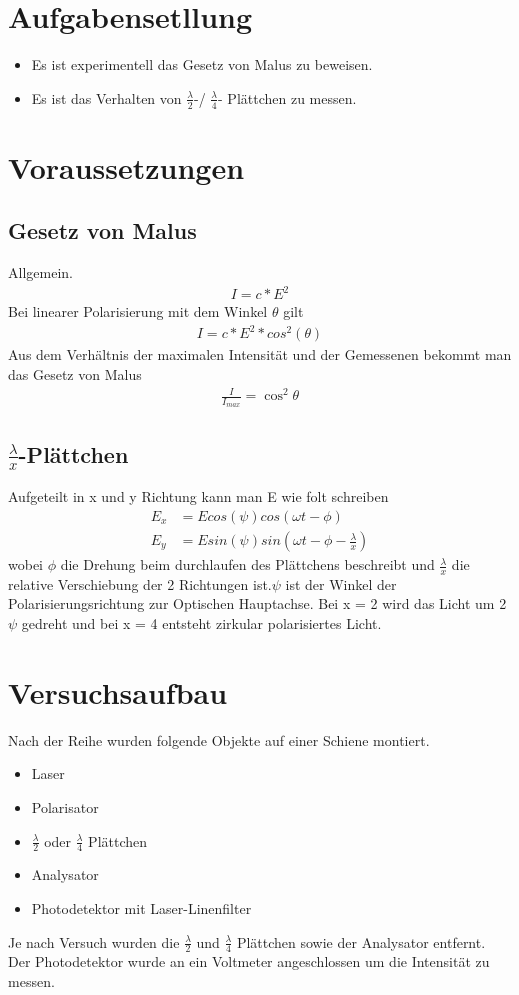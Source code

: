 \documentclass[a4paper]{article}
\begin{document}
\section{Aufgabensetllung}
\begin{itemize}
\item
  Es ist experimentell das Gesetz von Malus zu beweisen.
\item
  Es ist das Verhalten von $\frac{\lambda}{2}$-/ $\frac{\lambda}{4}$- Plättchen zu messen.
\end{itemize}

\section{Voraussetzungen}
\subsection{Gesetz von Malus}
Allgemein.
\begin{align}
  I = c * E^2 
\end{align}
Bei linearer Polarisierung mit dem Winkel $\theta$ gilt
\begin{align}
  I = c * E^2 * cos^2(\theta) 
\end{align}
Aus dem Verhältnis der maximalen Intensität und der Gemessenen bekommt man das Gesetz von Malus
\begin{align}
    \frac{I}{I_{max}}= \cos^2{\theta}
\end{align}
\subsection{$\frac{\lambda}{x}$-Plättchen}
Aufgeteilt in x und y Richtung kann man E wie folt schreiben
\begin{align}
  E_x &= E cos(\psi) cos(\omega t - \phi)\\
  E_y &= E sin(\psi) sin(\omega t - \phi - \frac{\lambda}{x})
\end{align}
wobei $\phi$ die Drehung beim durchlaufen des Plättchens beschreibt und $\frac{\lambda}{x}$ die relative Verschiebung der 2 Richtungen ist.$\psi$ ist der Winkel der Polarisierungsrichtung zur Optischen Hauptachse.
Bei x = 2 wird das Licht um 2 $\psi$ gedreht und bei x = 4 entsteht zirkular polarisiertes Licht.

\section{Versuchsaufbau}
Nach der Reihe wurden folgende Objekte auf einer Schiene montiert.
\begin{itemize}
\item Laser
\item Polarisator
\item $\frac{\lambda}{2}$ oder $\frac{\lambda}{4}$ Plättchen
\item Analysator
\item Photodetektor mit Laser-Linenfilter
\end{itemize}
Je nach Versuch wurden die $\frac{\lambda}{2}$ und $\frac{\lambda}{4}$ Plättchen sowie der Analysator entfernt.
Der Photodetektor wurde an ein Voltmeter angeschlossen um die Intensität zu messen.
\end{document}

